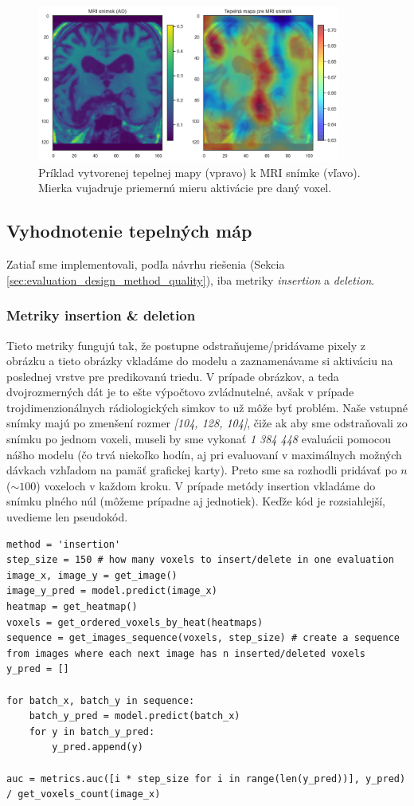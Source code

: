 \begin{figure}[h!]
    \centering
    \includegraphics[width=10cm]{assets/images/heatmap_example.png}
    \caption{Príklad vytvorenej tepelnej mapy (vpravo) k MRI snímke (vľavo). Mierka vujadruje priemernú mieru aktivácie pre daný voxel.}
    \label{fig:heatmap_example}
\end{figure}

\subsection{Vyhodnotenie tepelných máp}

Zatiaľ sme implementovali, podľa návrhu riešenia (Sekcia \ref{sec:evaluation_design_method_quality}), iba metriky \textit{insertion} a \textit{deletion}.

\subsubsection{Metriky insertion \& deletion \label{sec:insertion_deletion}}

Tieto metriky fungujú tak, že postupne odstraňujeme/pridávame pixely z obrázku a tieto obrázky vkladáme do modelu a zaznamenávame si aktiváciu na poslednej vrstve pre predikovanú triedu. V prípade obrázkov, a teda dvojrozmerných dát je to ešte výpočtovo zvládnutelné, avšak v prípade trojdimenzionálnych rádiologických simkov to už môže byť problém. Naše vstupné snímky majú po zmenšení rozmer \textit{[104, 128, 104]}, čiže ak aby sme odstraňovali zo snímku po jednom voxeli, museli by sme vykonať \textit{1 384 448} evaluácii pomocou nášho modelu (čo trvá niekoľko hodín, aj pri evaluovaní v maximálnych možných dávkach vzhľadom na pamäť grafickej karty). Preto sme sa rozhodli pridávať po $n$ ($\sim100$) voxeloch v každom kroku. V prípade metódy insertion vkladáme do snímku plného núl (môžeme prípadne aj jednotiek). Keďže kód je rozsiahlejší, uvedieme len pseudokód.

\begin{lstlisting}
method = 'insertion'
step_size = 150 # how many voxels to insert/delete in one evaluation
image_x, image_y = get_image()
image_y_pred = model.predict(image_x)
heatmap = get_heatmap()
voxels = get_ordered_voxels_by_heat(heatmaps)
sequence = get_images_sequence(voxels, step_size) # create a sequence from images where each next image has n inserted/deleted voxels
y_pred = []

for batch_x, batch_y in sequence:
    batch_y_pred = model.predict(batch_x)
    for y in batch_y_pred:
        y_pred.append(y)

auc = metrics.auc([i * step_size for i in range(len(y_pred))], y_pred) / get_voxels_count(image_x)
\end{lstlisting}

